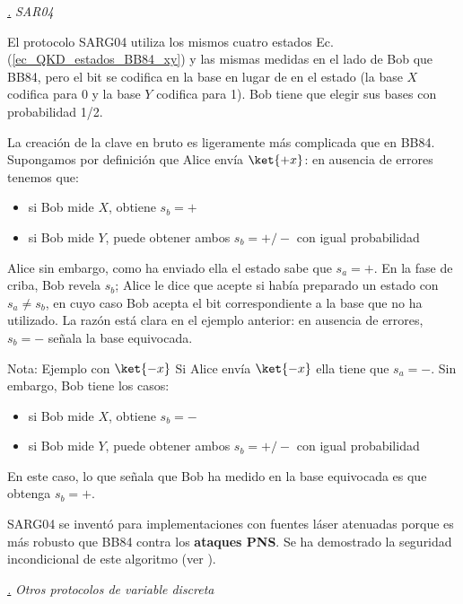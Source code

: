 \documentclass[a4paper,11pt]{book} %
\numberwithin{equation}{chapter}
\def\subsubiContadorIt{\par\addtocounter{subsubsection}{1}\underline{\it\thesubsubsection.}\hskip0.5cm \setcounter{subsubsubsectionIt}{0}}
\newcommand{\SubsubiIt}[1]{
		\subsubiContadorIt \textit{#1}
	}
\newcounter{subsubsubsectionIt}[subsubsection]
\begin{document}
			\SubsubiIt{SAR04}

El protocolo SARG04 \cite{bib_SAR04_1,bib_SAR04_2} utiliza los mismos cuatro estados Ec. (\ref{ec_QKD_estados_BB84_xy}) y las mismas medidas en el lado de Bob que BB84, pero el bit se codifica en la base en lugar de en el estado (la base $X$ codifica para 0 y la base $Y$ codifica para 1). Bob tiene que elegir sus bases con probabilidad 1/2. 

La creación de la clave en bruto es ligeramente más complicada que en BB84. Supongamos por definición que Alice envía $\ket{+x}$: en ausencia de errores tenemos que:
\begin{itemize}
	\item si Bob mide $X$, obtiene $s_b = +$
	\item si Bob mide $Y$, puede obtener ambos $s_b= +/-$ con igual probabilidad
\end{itemize}  
Alice sin embargo, como ha enviado ella el estado sabe que $s_a = +$. En la fase de criba, Bob revela $s_b$; Alice le dice que acepte si había preparado un estado con $s_a \neq s_b$, en cuyo caso Bob acepta el bit correspondiente a la base que no ha utilizado. La razón está clara en el ejemplo anterior: en ausencia de errores, $s_b= -$ señala la base equivocada.

	\begin{mybox_blue}{Nota: Ejemplo con $\ket{-x}$}
	Si Alice envía $\ket{-x}$ ella tiene que $s_a = -$. Sin embargo, Bob tiene los casos:
	\begin{itemize}
		\item si Bob mide $X$, obtiene $s_b = -$
		\item si Bob mide $Y$, puede obtener ambos $s_b= +/-$ con igual probabilidad
	\end{itemize} 
	En este caso, lo que señala que Bob ha medido en la base equivocada es que obtenga $s_b = +$.
	\end{mybox_blue}

SARG04 se inventó para implementaciones con fuentes láser atenuadas porque es más robusto que BB84 contra los \textbf{ataques PNS}. Se ha demostrado la seguridad incondicional de este algoritmo (ver \cite{bib_QKD_resumen}).


			\SubsubiIt{Otros protocolos de variable discreta}
\end{document}
